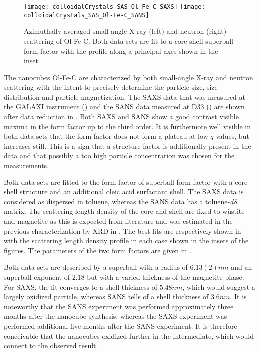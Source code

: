 \documentclass[\main/dresen_thesis.tex]{subfiles}
\begin{document}
  \label{sec:colloidalCrystals:nanoparticle:sas}

  \begin{figure}[htbp]
    \centering
    \texttt{[image: colloidalCrystals\_SAS\_Ol-Fe-C\_SAXS]}
    \texttt{[image: colloidalCrystals\_SAS\_Ol-Fe-C\_SANS]}
    \caption{\label{fig:colloidalCrystals:nanoparticle:sas}Azimuthally averaged small-angle X-ray (left) and neutron (right) scattering of Ol-Fe-C. Both data sets are fit to a core-shell superball form factor with the profile along a principal axes shown in the inset.}
  \end{figure}
  The nanocubes Ol-Fe-C are characterized by both small-angle X-ray and neutron scattering with the intent to precisely determine the particle size, size distribution and particle magnetization.
  The SAXS data that was measured at the GALAXI instrument () and the SANS data measured at D33 () are shown after data reduction in .
  Both SAXS and SANS show a good contrast visible maxima in the form factor up to the third order.
  It is furthermore well visible in both data sets that the form factor does not form a plateau at low $q$ values, but increases still.
  This is a sign that a structure factor is additionally present in the data and that possibly a too high particle concentration was chosen for the measurements.

  Both data sets are fitted to the form factor of superball form factor with a core-shell structure and an additional oleic acid surfactant shell.
  The SAXS data is considered as dispersed in toluene, whereas the SANS data has a toluene-\textit{d8} matrix.
  The scattering length density of the core and shell are fixed to w\"ustite and magnetite as this is expected from literature \cite{Wetterskog_2013_Anoma} and was estimated in the previous characterization by XRD in .
  The best fits are respectively shown in  with the scattering length density profile in each case shown in the insets of the figures.
  The parameters of the two form factors are given in .

  Both data sets are described by a superball with a radius of $6.13(2) \unit{nm}$ and an superball exponent of $2.18$ but with a varied thickness of the magnetite phase.
  For SAXS, the fit converges to a shell thickness of $5.48 \unit{nm}$, which would suggest a largely oxidized particle, whereas SANS tells of a shell thickness of $3.6 \unit{nm}$.
  It is noteworthy that the SANS experiment was performed approximately three months after the nanocube synthesis, whereas the SAXS experiment was performed additional five months after the SANS experiment.
  It is therefore conceivable that the nanocubes oxidized further in the intermediate, which would connect to the observed result.
\end{document}
